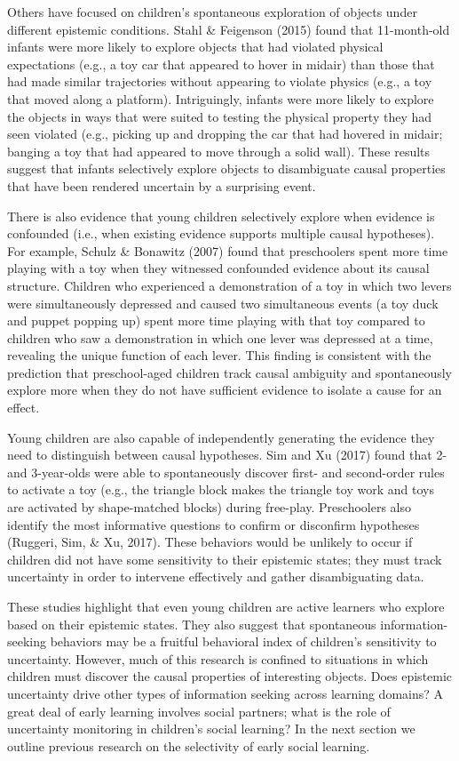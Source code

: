 \documentclass[a4paper,man,apacite,floatsintext]{apa6}
\begin{document}
Others have focused on children's spontaneous exploration of objects
under different epistemic conditions. Stahl \& Feigenson (2015) found
that 11-month-old infants were more likely to explore objects that had
violated physical expectations (e.g., a toy car that appeared to hover
in midair) than those that had made similar trajectories without
appearing to violate physics (e.g., a toy that moved along a platform).
Intriguingly, infants were more likely to explore the objects in ways
that were suited to testing the physical property they had seen violated
(e.g., picking up and dropping the car that had hovered in midair;
banging a toy that had appeared to move through a solid wall). These
results suggest that infants selectively explore objects to disambiguate
causal properties that have been rendered uncertain by a surprising
event.

There is also evidence that young children selectively explore when
evidence is confounded (i.e., when existing evidence supports multiple
causal hypotheses). For example, Schulz \& Bonawitz (2007) found that
preschoolers spent more time playing with a toy when they witnessed
confounded evidence about its causal structure. Children who experienced
a demonstration of a toy in which two levers were simultaneously
depressed and caused two simultaneous events (a toy duck and puppet
popping up) spent more time playing with that toy compared to children
who saw a demonstration in which one lever was depressed at a time,
revealing the unique function of each lever. This finding is consistent
with the prediction that preschool-aged children track causal ambiguity
and spontaneously explore more when they do not have sufficient evidence
to isolate a cause for an effect.

Young children are also capable of independently generating the evidence
they need to distinguish between causal hypotheses. Sim and Xu (2017)
found that 2- and 3-year-olds were able to spontaneously discover first-
and second-order rules to activate a toy (e.g., the triangle block makes
the triangle toy work and toys are activated by shape-matched blocks)
during free-play. Preschoolers also identify the most informative
questions to confirm or disconfirm hypotheses (Ruggeri, Sim, \& Xu,
2017). These behaviors would be unlikely to occur if children did not
have some sensitivity to their epistemic states; they must track
uncertainty in order to intervene effectively and gather disambiguating
data.

These studies highlight that even young children are active learners who
explore based on their epistemic states. They also suggest that
spontaneous information-seeking behaviors may be a fruitful behavioral
index of children's sensitivity to uncertainty. However, much of this
research is confined to situations in which children must discover the
causal properties of interesting objects. Does epistemic uncertainty
drive other types of information seeking across learning domains? A
great deal of early learning involves social partners; what is the role
of uncertainty monitoring in children's social learning? In the next
section we outline previous research on the selectivity of early social
learning.
\end{document}
